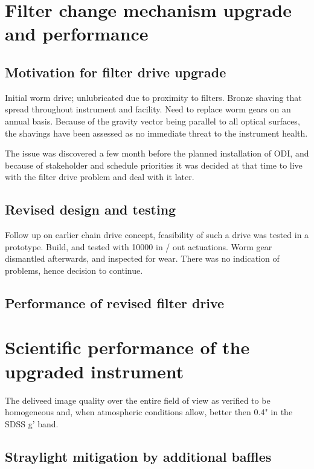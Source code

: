 \documentclass[draft]{spieman}
\begin{document}
\section{Filter change mechanism upgrade and performance}

\subsection{Motivation for filter drive upgrade} Initial worm drive;
unlubricated due to proximity to filters. Bronze shaving that spread
throughout instrument and facility.  Need to replace worm gears on an annual
basis. Because of the gravity vector being parallel to all optical surfaces,
the shavings have been assessed as no immediate threat to the instrument
health.

The issue was discovered a few month before the planned installation of ODI,
and because of stakeholder and schedule priorities it was decided at that
time to live with the filter drive problem and deal with it later.

\subsection{Revised design and testing}

Follow up on earlier chain drive concept, feasibility of such a drive was
tested in a prototype. Build, and tested with 10000 in / out actuations.
Worm gear dismantled afterwards, and inspected for wear. There was no
indication of problems, hence decision to continue.


\subsection{Performance of revised filter drive}






\section{Scientific performance of the upgraded instrument}

The deliveed image quality over the entire field of view as verified to be homogeneous and, when 
atmospheric conditions allow, better then 0.4" in the SDSS g' band.


\subsection{Straylight mitigation by additional baffles}
\end{document}
